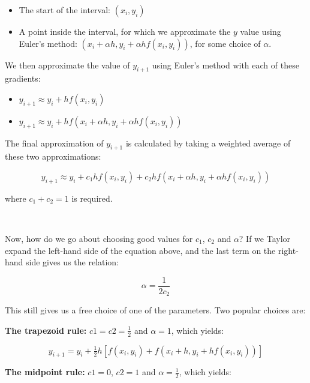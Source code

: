 \documentclass[11pt]{article}
\providecommand{\tightlist}{%
      \setlength{\itemsep}{0pt}\setlength{\parskip}{0pt}}
\begin{document}
\begin{itemize}
\tightlist
\item
  The start of the interval: \((x_i, y_i)\)
\item
  A point inside the interval, for which we approximate the \(y\) value
  using Euler's method:
  \((x_i + \alpha h, y_i + \alpha h f(x_i, y_i))\), for some choice of
  \(\alpha\).
\end{itemize}

We then approximate the value of \(y_{i+1}\) using Euler's method with
each of these gradients:

\begin{itemize}
\tightlist
\item
  \(y_{i+1} \approx y_i + h f(x_i, y_i)\)
\item
  \(y_{i+1} \approx y_i + h f(x_i + \alpha h, y_i + \alpha h f(x_i, y_i))\)
\end{itemize}

The final approximation of \(y_{i+1}\) is calculated by taking a
weighted average of these two approximations:

\[
y_{i+1} \approx y_i + c_1 h f(x_i, y_i) + c_2 h f(x_i + \alpha h, y_i + \alpha h f(x_i, y_i) )
\]

where \(c_1 + c_2 = 1\) is required.



    \begin{center}
    \end{center}
    { \hspace*{\fill} \\}
    


    Now, how do we go about choosing good values for \(c_1\), \(c_2\) and
\(\alpha\)? If we Taylor expand the left-hand side of the equation
above, and the last term on the right-hand side gives us the relation:

\[
\alpha = \frac{1}{2 c_2}
\]

This still gives us a free choice of one of the parameters. Two popular
choices are:

\textbf{The trapezoid rule:} \(c1 = c2 = \tfrac{1}{2}\) and
\(\alpha = 1\), which yields:

\[
y_{i+1} = y_i + \tfrac{1}{2} h \left[ f(x_i, y_i) + f(x_i + h, y_i + h f(x_i, y_i)) \right]
\]

\textbf{The midpoint rule:} \(c1 = 0\), \(c2 = 1\) and
\(\alpha = \tfrac{1}{2}\), which yields:
\end{document}
